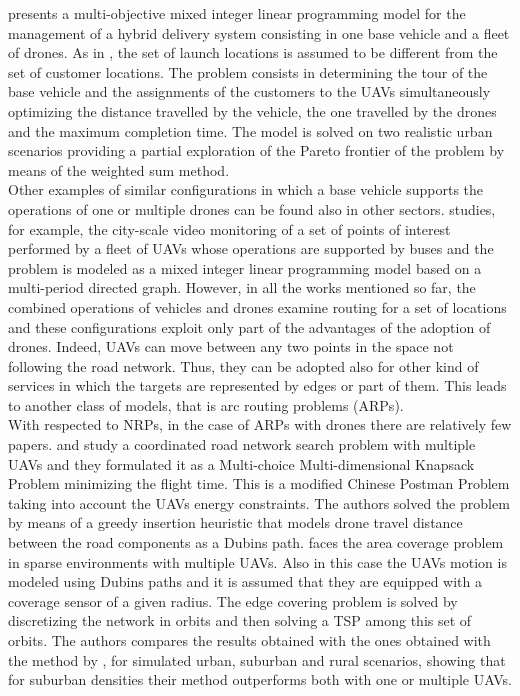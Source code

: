 \cite{art:Amorosi2020} presents a multi-objective mixed integer linear programming model for the management of a hybrid delivery system consisting in one base vehicle and a fleet of drones. As in \cite{art:Poikonen2020}, the set of launch locations is assumed to be different from the set of customer locations. The problem consists in determining the tour of the base vehicle and the assignments of the customers to the UAVs simultaneously optimizing the distance travelled by the vehicle, the one travelled by the drones and the maximum completion time. The model is solved on two realistic urban scenarios providing a partial exploration of the Pareto frontier of the problem by means of the weighted sum method.\\
Other examples of similar configurations in which a base vehicle supports the operations of one or multiple drones can be found also in other sectors. 
\cite{art:Trotta2018} studies, for example, the city-scale video monitoring of a set of points of interest performed by a fleet of UAVs whose operations are supported by buses and the problem is modeled as a mixed integer linear programming model based on a multi-period directed graph.
However, in all the works mentioned so far, the combined operations of vehicles and drones examine routing for a set of locations and these configurations exploit only part of the advantages of the adoption of drones. Indeed, UAVs can move between any two points in the space not following the road network. Thus, they can be adopted also for other kind of services in which the targets are represented by edges or part of them. This leads to another class of models, that is arc routing problems (ARPs).\\
With respected to NRPs, in the case of ARPs with drones there are relatively few papers. \cite{art:Oh2011} and \cite{art:Oh2014} study a coordinated road network search problem with multiple UAVs and they formulated it as a Multi-choice Multi-dimensional Knapsack Problem minimizing the flight time. This is a modified Chinese Postman Problem taking into account the UAVs energy  constraints. The authors solved the problem by means of a greedy insertion heuristic that models drone travel distance between the road components as a Dubins path.
\cite{art:Dille2013} faces the area coverage problem in sparse environments with multiple UAVs. Also in this case the UAVs motion is modeled using Dubins paths and it is assumed that they are equipped with a coverage sensor of a given radius.
The edge covering problem is solved by discretizing the network in orbits and then solving a TSP among this set of orbits. The authors compares the results obtained with the ones obtained with the method by \cite{art:Oh2014}, for simulated urban, suburban and rural scenarios, showing that for suburban densities their method outperforms both with one or multiple UAVs. 
